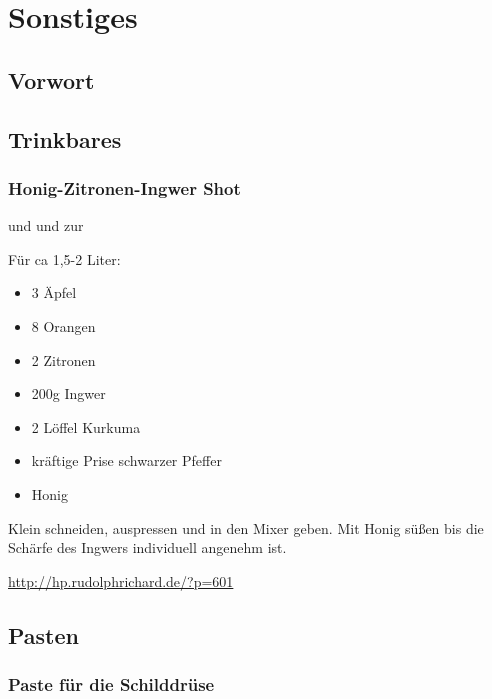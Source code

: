 \chapter{Sonstiges}

\section{Vorwort}

\lipsum[1-5]
\newpage





\section{Trinkbares}


\subsection{Honig-Zitronen-Ingwer Shot}

 und  und zur 

Für ca 1,5-2 Liter:
\begin{itemize}
	\item 3 Äpfel
	\item 8 Orangen
	\item 2 Zitronen
	\item 200g Ingwer
	\item 2 Löffel Kurkuma
	\item kräftige Prise schwarzer Pfeffer
	\item Honig
\end{itemize}

Klein schneiden, auspressen und in den Mixer geben. Mit Honig süßen bis die Schärfe des Ingwers individuell angenehm ist.

\url{http://hp.rudolphrichard.de/?p=601}











\section{Pasten}

\subsection{Paste für die Schilddrüse}
 
